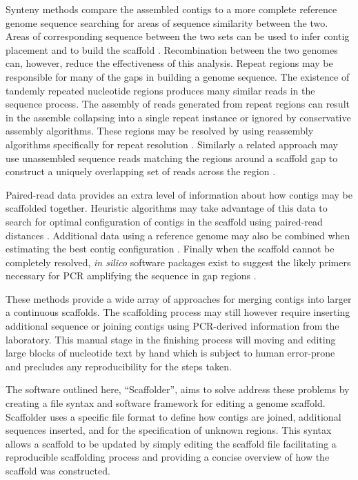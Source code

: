 \documentclass[10pt]{bmc_article}
\newenvironment{bmcformat}{\begin{raggedright}\baselineskip20pt\sloppy\setboolean{publ}{false}}{\end{raggedright}\baselineskip20pt\sloppy}
\begin{document}
\begin{bmcformat}
Synteny methods compare the assembled contigs to a more complete reference
genome sequence searching for areas of sequence similarity between the two.
Areas of corresponding sequence between the two sets can be used to infer
contig placement and to build the scaffold
\cite{richter2007,zhao2008,assefa2009}. Recombination between the two genomes
can, however, reduce the effectiveness of this analysis. Repeat regions may be
responsible for many of the gaps in building a genome sequence. The existence
of tandemly repeated nucleotide regions produces many similar reads in the
sequence process. The assembly of reads generated from repeat regions can
result in the assemble collapsing into a single repeat instance or ignored by
conservative assembly algorithms. These regions may be resolved by using
reassembly algorithms specifically for repeat resolution
\cite{mulyukov2002,koren2010}. Similarly a related approach may use unassembled
sequence reads matching the regions around a scaffold gap to construct
a uniquely overlapping set of reads across the region \cite{tsai2010}. \pb

Paired-read data provides an extra level of information about how contigs may
be scaffolded together. Heuristic algorithms may take advantage of this data to
search for optimal configuration of contigs in the scaffold using paired-read
distances \cite{dayarian2010,boetzer2011}. Additional data using a reference
genome may also be combined when estimating the best contig configuration
\cite{pop2004}. Finally when the scaffold cannot be completely resolved,
\emph{in silico} software packages exist to suggest the likely primers
necessary for PCR amplifying the sequence in gap regions
\cite{gordon2001,nagarajan2010}. \pb

These methods provide a wide array of approaches for merging contigs into
larger a continuous scaffolds. The scaffolding process may still however
require inserting additional sequence or joining contigs using PCR-derived
information from the laboratory. This manual stage in the finishing process
will moving and editing large blocks of nucleotide text by hand which is subject
to human error-prone and precludes any reproducibility for the steps taken. \pb

The software outlined here, ``Scaffolder'', aims to solve address these
problems by creating a file syntax and software framework for editing a genome
scaffold. Scaffolder uses a specific file format to define how contigs are
joined, additional sequences inserted, and for the specification of unknown
regions. This syntax allows a scaffold to be updated by simply editing the
scaffold file facilitating a reproducible scaffolding process and providing
a concise overview of how the scaffold was constructed. \pb


\end{bmcformat}
\end{document}
